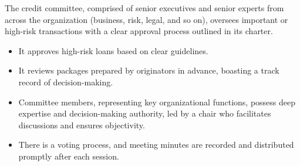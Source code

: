 
The credit committee, comprised of senior executives and senior experts from
across the organization (business, risk, legal, and so on), oversees important or
high-risk transactions with a clear approval process outlined in its charter.

\begin{itemize}
\item It approves high-risk loans based on clear guidelines.
\item It reviews packages prepared by originators in advance, boasting a track
record of decision-making.
\item Committee members, representing key organizational functions, possess deep
expertise and decision-making authority, led by a chair who facilitates
discussions and ensures objectivity.
\item There is a voting process, and meeting minutes are recorded and distributed
promptly after each session.
\end{itemize}
